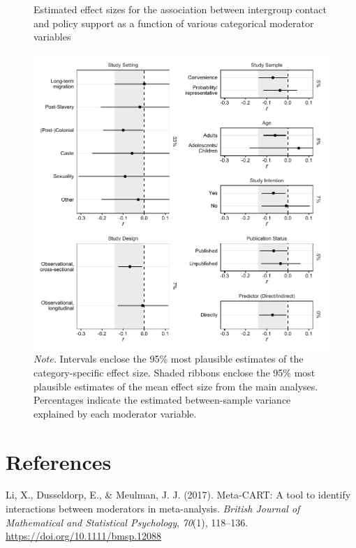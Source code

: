 \documentclass[12pt, letterpaper]{article}
\begin{document}
\begin{figure}
\centering
\caption{Estimated effect sizes for the association between intergroup contact and policy support as a function of various categorical moderator variables}
\includegraphics[scale=1]{../figures/figure-s2}
\caption*{\textit{Note.} Intervals enclose the 95\% most plausible estimates of the category-specific effect size. Shaded ribbons enclose the 95\% most plausible estimates of the mean effect size from the main analyses. Percentages indicate the estimated between-sample variance explained by each moderator variable.}
\label{fig:s2}
\end{figure}

\hypertarget{references}{%
\section{References}\label{references}}

\begingroup

\noindent \setlength{\parindent}{-0.5in} \setlength{\leftskip}{0.5in}

\hypertarget{refs}{}
\leavevmode\hypertarget{ref-li_meta-cart_2017}{}%
Li, X., Dusseldorp, E., \& Meulman, J. J. (2017). Meta-CART: A tool to
identify interactions between moderators in meta-analysis. \emph{British
Journal of Mathematical and Statistical Psychology}, \emph{70}(1),
118--136. \url{https://doi.org/10.1111/bmsp.12088}
\end{document}
